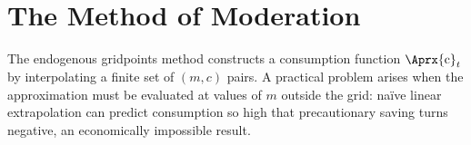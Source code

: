 \documentclass[titlepage, headings=optiontotocandhead]{econark}
\begin{document}
{
}
\hypertarget{method-of-moderation}{}
\section{The Method of Moderation}\label{sec:method-of-moderation}

The endogenous gridpoints method constructs a consumption function
$\Aprx{\mathrm{c}}_{t}$ by interpolating a finite set of
$(m,c)$ pairs.  A practical problem arises when the
approximation must be evaluated at values of $m$ outside the
grid: na\"ive linear extrapolation can predict consumption so high
that precautionary saving turns negative, an economically impossible
result.
\end{document}
